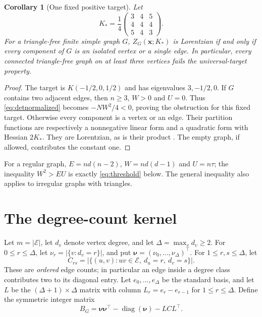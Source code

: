 \documentclass[11pt]{article}
\newtheorem{corollary}[theorem]{Corollary}
\theoremstyle{remark}
\DeclareMathOperator{\diag}{diag}
\newcommand{\bnu}{\boldsymbol{\nu}}
\begin{document}
\begin{corollary}[One fixed positive target]\label{cor:trianglefree}
Let
\begin{equation}
 K_* =\frac14\begin{pmatrix}3&4&5\\4&4&4\\5&4&3\end{pmatrix}.
                                                               \label{eq:Kstar}
\end{equation}
For a triangle-free finite simple graph $G$, $Z_G(\mathbf x;K_*)$
is Lorentzian if and only if every component of $G$ is an isolated
vertex or a single edge. In particular, every connected triangle-free
graph on at least three vertices fails the universal-target property.
\end{corollary}
\begin{proof}
The target is $K(-1/2,0,1/2)$ and has eigenvalues $3,-1/2,0$.
If $G$ contains two adjacent edges, then $n\geq3$, $W>0$ and $U=0$.
Thus \eqref{eq:detnormalized} becomes $-NW^2/4<0$, proving the
obstruction for this fixed target.
Otherwise every component is a vertex or an edge. Their partition
functions are respectively a nonnegative linear form and a
quadratic form with Hessian $2K_*$. They are Lorentzian, as is
their product \cite[Corollary 2.32]{BH}. The empty graph, if allowed,
contributes the constant one.
\end{proof}

For a regular graph, $E=nd(n-2)$, $W=nd(d-1)$ and $U=n\tau$;
the inequality $W^2>EU$ is exactly \eqref{eq:threshold} below.
The general inequality also applies to irregular graphs with triangles.

\section{The degree-count kernel}
Let $m=|\mathcal{E}|$, let $d_v$ denote vertex degree, and let
$\Delta=\max_v d_v\geq2$. For $0\leq r\leq\Delta$, let
$\nu_r=|\{v:d_v=r\}|$, and put $\bnu=(\nu_0,\ldots,\nu_\Delta)^\top$.
For $1\leq r,s\leq\Delta$, let
\begin{equation}
 C_{rs}=|\{(u,v):uv\in\mathcal{E},\ d_u=r,\ d_v=s\}|.
                                                        \label{eq:C}
\end{equation}
These are \emph{ordered} edge counts; in particular an edge inside a
degree class contributes two to its diagonal entry.
Let $e_0,\ldots,e_\Delta$ be the standard basis, and let
$L$ be the $(\Delta+1)\times\Delta$ matrix with column
$L_r=e_r-e_{r-1}$ for $1\leq r\leq\Delta$.
Define the symmetric integer matrix
\begin{equation}
 B_G=\bnu\bnu^\top-\diag(\bnu)-LCL^\top.                \label{eq:B}
\end{equation}
\end{document}

